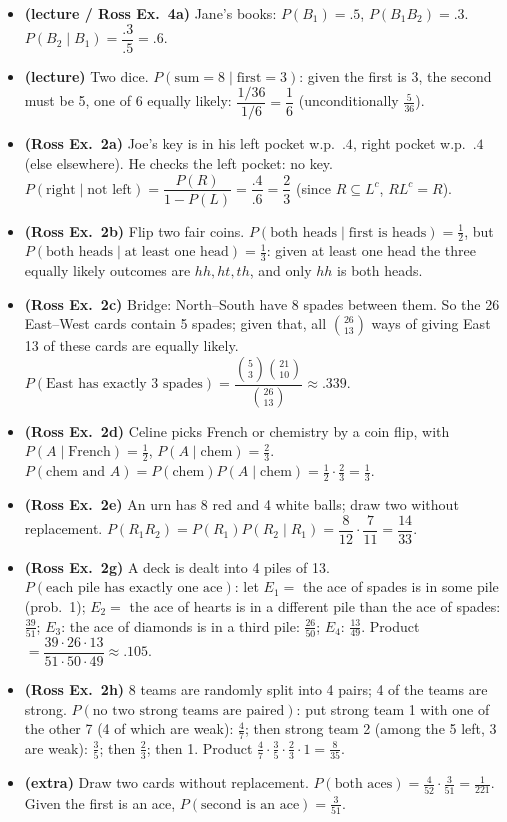 \documentclass[11pt]{article}
\begin{document}
\begin{exbox}[Examples]
\begin{itemize}
\item \textbf{(lecture / Ross Ex.\ 4a)} Jane's books: $P(B_1)=.5$, $P(B_1B_2)=.3$. $P(B_2\mid B_1)=\dfrac{.3}{.5}=.6$.
\item \textbf{(lecture)} Two dice. $P(\text{sum}=8\mid\text{first}=3)$: given the first is 3, the second must be 5, one of 6 equally likely: $\dfrac{1/36}{1/6}=\dfrac16$ (unconditionally $\tfrac5{36}$).
\item \textbf{(Ross Ex.\ 2a)} Joe's key is in his left pocket w.p.\ $.4$, right pocket w.p.\ $.4$ (else elsewhere). He checks the left pocket: no key. $P(\text{right}\mid\text{not left})=\dfrac{P(R)}{1-P(L)}=\dfrac{.4}{.6}=\dfrac23$ (since $R\subseteq L^c$, $RL^c=R$).
\item \textbf{(Ross Ex.\ 2b)} Flip two fair coins. $P(\text{both heads}\mid\text{first is heads})=\tfrac12$, but $P(\text{both heads}\mid\text{at least one head})=\tfrac13$: given at least one head the three equally likely outcomes are $hh,ht,th$, and only $hh$ is both heads.
\item \textbf{(Ross Ex.\ 2c)} Bridge: North--South have 8 spades between them. So the 26 East--West cards contain 5 spades; given that, all $\binom{26}{13}$ ways of giving East 13 of these cards are equally likely. $P(\text{East has exactly 3 spades})=\dfrac{\binom53\binom{21}{10}}{\binom{26}{13}}\approx.339$.
\item \textbf{(Ross Ex.\ 2d)} Celine picks French or chemistry by a coin flip, with $P(A\mid\text{French})=\tfrac12$, $P(A\mid\text{chem})=\tfrac23$. $P(\text{chem and }A)=P(\text{chem})P(A\mid\text{chem})=\tfrac12\cdot\tfrac23=\tfrac13$.
\item \textbf{(Ross Ex.\ 2e)} An urn has 8 red and 4 white balls; draw two without replacement. $P(R_1R_2)=P(R_1)P(R_2\mid R_1)=\dfrac8{12}\cdot\dfrac7{11}=\dfrac{14}{33}$.
\item \textbf{(Ross Ex.\ 2g)} A deck is dealt into 4 piles of 13. $P(\text{each pile has exactly one ace})$: let $E_1=$ the ace of spades is in some pile (prob.\ 1); $E_2=$ the ace of hearts is in a different pile than the ace of spades: $\tfrac{39}{51}$; $E_3$: the ace of diamonds is in a third pile: $\tfrac{26}{50}$; $E_4$: $\tfrac{13}{49}$. Product $=\dfrac{39\cdot26\cdot13}{51\cdot50\cdot49}\approx.105$.
\item \textbf{(Ross Ex.\ 2h)} 8 teams are randomly split into 4 pairs; 4 of the teams are strong. $P(\text{no two strong teams are paired})$: put strong team 1 with one of the other 7 (4 of which are weak): $\tfrac47$; then strong team 2 (among the 5 left, 3 are weak): $\tfrac35$; then $\tfrac23$; then 1. Product $\tfrac47\cdot\tfrac35\cdot\tfrac23\cdot1=\tfrac8{35}$.
\item \textbf{(extra)} Draw two cards without replacement. $P(\text{both aces})=\tfrac4{52}\cdot\tfrac3{51}=\tfrac1{221}$. Given the first is an ace, $P(\text{second is an ace})=\tfrac3{51}$.
\end{itemize}
\end{exbox}
\end{document}
